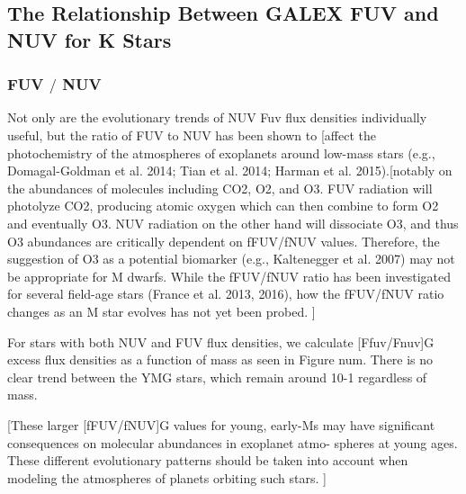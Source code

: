\documentclass[twocolumn]{aastex62}
\begin{document}
\subsection{The Relationship Between GALEX FUV and NUV for K Stars}
\subsubsection{FUV $/$ NUV}

Not only are the evolutionary trends of NUV Fuv flux densities individually useful, but the ratio of FUV to NUV has been shown to [affect the photochemistry of the atmospheres of exoplanets around low-mass stars (e.g., Domagal-Goldman et al. 2014; Tian et al. 2014; Harman et al. 2015).[notably on the abundances of molecules including CO2, O2, and O3. FUV radiation will photolyze CO2, producing atomic oxygen which can then combine to form O2 and eventually O3. NUV radiation on the other hand will dissociate O3, and thus O3 abundances are critically dependent on fFUV/fNUV values. Therefore, the suggestion of O3 as a potential biomarker (e.g., Kaltenegger et al. 2007) may not be appropriate for M dwarfs. While the fFUV/fNUV ratio has been investigated for several field-age stars (France et al. 2013, 2016), how the fFUV/fNUV ratio changes as an M star evolves has not yet been probed. ]

For stars with both NUV and FUV flux densities, we calculate [Ffuv/Fnuv]G excess flux densities as a function of mass as seen in Figure num. There is no clear trend between the YMG stars, which remain around 10-1 regardless of mass. 

[These larger [fFUV/fNUV]G values for young, early-Ms may have significant consequences on molecular abundances in exoplanet atmo- spheres at young ages. These different evolutionary patterns should be taken into account when modeling the atmospheres of planets orbiting such stars. ]
\end{document}
